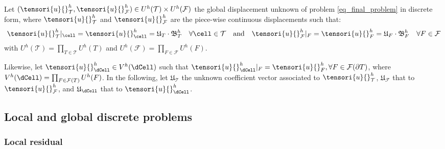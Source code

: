Let $(\tensori{u}{}_{\mathcal{T}}^h, \tensori{u}{}_{\mathcal{F}}^h)
\in U^h(\mathcal{T}) \times U^h(\mathcal{F})$ the global displacement
unknown of problem \eqref{eq_final_problem} in discrete form, where
$\tensori{u}{}_{\mathcal{T}}^h$ and $\tensori{u}{}_{\mathcal{F}}^h$ are
the piece-wise continuous displacements such that:
\begin{equation}
  \begin{aligned}
    \tensori{u}{}_{\mathcal{T}}^h
    \vert_{\cell} = \tensori{u}{}_{\cell}^h = \mathfrak{U}_T \cdot
    \mathfrak{B}_T^h && \forall \cell \in \mathcal{T} && \text{and} &&
    \tensori{u}{}_{\mathcal{F}}^h \vert_{F} = \tensori{u}{}_{F}^h =
    \mathfrak{U}_F \cdot \mathfrak{B}_F^h && \forall F \in \mathcal{F}
  \end{aligned}
\end{equation}
with $U^h(\mathcal{T}) = \prod_{T \in \mathcal{T}} U^h(T)$ and
$U^h(\mathcal{F}) = \prod_{F \in \mathcal{F}} U^h(F)$.

Likewise, let $\tensori{u}{}_{\dCell}^h \in V^h(\dCell)$ such
that $\tensori{u}{}_{\dCell}^h \vert_F = \tensori{u}{}_{F}^h, \forall F
\in \mathcal{F}(\partial T)$, where $V^h(\dCell) = \prod_{F \in
  \mathcal{F}(T)} U^h(F)$. In the following, let
$\mathfrak{U}_{\mathcal{T}}$ the unknown coefficient vector associated
to $\tensori{u}{}^h_{\mathcal{T}}$, $\mathfrak{U}_{\mathcal{F}}$ that to
$\tensori{u}{}^h_{\mathcal{F}}$, and $\mathfrak{U}_{\mathcal{\dCell}}$
that to $\tensori{u}{}^h_{\dCell}$.

\subsection{Local and global discrete problems}

\subsubsection{Local residual}

